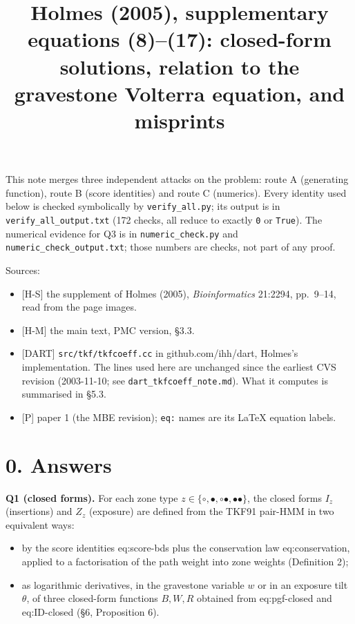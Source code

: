 \documentclass[10pt,]{article}
\title{Holmes (2005), supplementary equations (8)--(17): closed-form solutions,
relation to the gravestone Volterra equation, and misprints}
\date{}
\providecommand{\tightlist}{%
  \setlength{\itemsep}{0pt}\setlength{\parskip}{0pt}}
\begin{document}
\maketitle

This note merges three independent attacks on the problem: route A
(generating function), route B (score identities) and route C
(numerics). Every identity used below is checked symbolically by
\texttt{verify\_all.py}; its output is in
\texttt{verify\_all\_output.txt} (172 checks, all reduce to exactly
\texttt{0} or \texttt{True}). The numerical evidence for Q3 is in
\texttt{numeric\_check.py} and \texttt{numeric\_check\_output.txt};
those numbers are checks, not part of any proof.

Sources:

\begin{itemize}
\tightlist
\item
  {[}H-S{]} the supplement of Holmes (2005), \emph{Bioinformatics}
  21:2294, pp.~9--14, read from the page images.
\item
  {[}H-M{]} the main text, PMC version, §3.3.
\item
  {[}DART{]} \texttt{src/tkf/tkfcoeff.cc} in github.com/ihh/dart,
  Holmes's implementation. The lines used here are unchanged since the
  earliest CVS revision (2003-11-10; see
  \texttt{dart\_tkfcoeff\_note.md}). What it computes is summarised in
  §5.3.
\item
  {[}P{]} paper 1 (the MBE revision); \texttt{eq:} names are its LaTeX
  equation labels.
\end{itemize}

\hypertarget{answers}{%
\section{0. Answers}\label{answers}}

\textbf{Q1 (closed forms).} For each zone type
\(z\in\{\circ,\bullet,\circ\bullet,\bullet\bullet\}\), the closed forms
\(I_z\) (insertions) and \(Z_z\) (exposure) are defined from the TKF91
pair-HMM in two equivalent ways:

\begin{itemize}
\tightlist
\item
  by the score identities eq:score-bds plus the conservation law
  eq:conservation, applied to a factorisation of the path weight into
  zone weights (Definition 2);
\item
  as logarithmic derivatives, in the gravestone variable \(w\) or in an
  exposure tilt \(\theta\), of three closed-form functions \(B,W,R\)
  obtained from eq:pgf-closed and eq:ID-closed (§6, Proposition 6).
\end{itemize}
\end{document}
